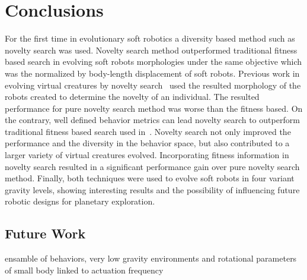 \documentclass{sig-alternate}
\begin{document}
\section{Conclusions}
For the first time in evolutionary soft robotics a diversity based method such as novelty search was used. Novelty search method outperformed traditional fitness based search in evolving soft robots morphologies under the same objective which was the normalized by body-length displacement of soft robots. Previous work in evolving virtual creatures by novelty search~\cite{lehman2011evolving} used the resulted morphology of the robots created to determine the novelty of an individual. The resulted performance for pure novelty search method was worse than the fitness based. On the contrary, well defined behavior metrics can lead novelty search to outperform traditional fitness based search used in~\cite{cheney2013unshackling}. Novelty search not only improved the performance and the diversity in the behavior space, but also contributed to a larger variety of virtual creatures evolved. Incorporating fitness information in novelty search resulted in a significant performance gain over pure novelty search method. Finally, both techniques were used to evolve soft robots in four variant gravity levels, showing interesting results and the possibility of influencing future robotic designs for planetary exploration.

\subsection{Future Work}
ensamble of behaviors, very low gravity environments and rotational parameters of small body linked to actuation frequency


\begingroup
{}


\endgroup
\end{document}
